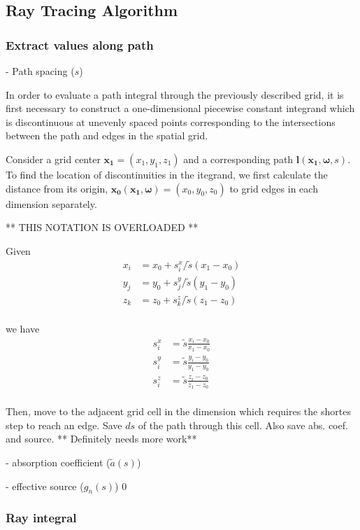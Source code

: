 \documentclass[10pt]{article}
\renewcommand\vec{\mathbf}
\begin{document}
\subsection{Ray Tracing Algorithm}
\subsubsection{Extract values along path}
- Path spacing ($s$)

In order to evaluate a path integral through the previously described grid, it
is first necessary to construct a one-dimensional piecewise constant integrand
which is discontinuous at unevenly spaced points corresponding to the
intersections between the path and edges in the spatial grid.

Consider a grid center $\vec{x_1} = (x_1,y_1,z_1)$ and a corresponding path $\vec{l}(\vec{x_1}, \vec{\omega}, s)$.
To find the location of discontinuities in the itegrand, we first calculate the
distance from its origin, $\vec{x_0}(\vec{x_1}, \vec{\omega}) = (x_0, y_0, z_0)$ to grid edges in each dimension
separately.


** THIS NOTATION IS OVERLOADED **

Given
\begin{align}
  x_i &= x_0 + s_i^x/\tilde{s}(x_1-x_0) \\
  y_j &= y_0 + s_j^y/\tilde{s}(y_1-y_0) \\
  z_k &= z_0 + s_k^z/\tilde{s}(z_1-z_0) \\
\end{align}

we have
\begin{align}
  s_i^x &= \tilde{s}\frac{x_i-x_0}{x_1-x_0} \\
  s_i^y &= \tilde{s}\frac{y_i-y_0}{y_1-y_0} \\
  s_i^z &= \tilde{s}\frac{z_i-z_0}{z_1-z_0} \\
\end{align}

Then, move to the adjacent grid cell in the dimension which requires the shortes
step to reach an edge. Save $ds$ of the path through this cell. Also save abs.
coef. and source.
** Definitely needs more work**

- absorption coefficient ($\tilde{a}(s)$)

- effective source ($g_n(s)$)
0
\subsubsection{Ray integral}
\end{document}
